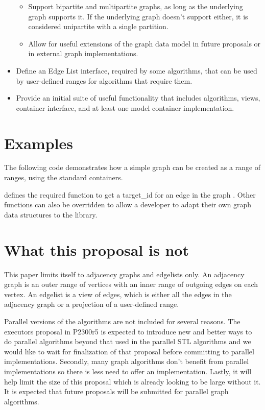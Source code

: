 \begin{itemize}
\begin{itemize}
\item Support bipartite and multipartite graphs, as long as the underlying graph supports it. If the underlying graph doesn't support either,
      it is considered unipartite with a single partition.
\item Allow for useful extensions of the graph data model in future proposals or in external graph implementations. 
\end{itemize}
\item Define an Edge List interface, required by some algorithms, that can be used by user-defined ranges for algorithms that require them.
\item Provide an initial suite of useful functionality that includes algorithms, views, container interface, and at least one 
model container implementation.
\end{itemize}

\section{Examples}


The following code demonstrates how a simple graph can be created as a range of ranges, using the standard containers. 



{\small
  
}

 defines the required function to get a target\_id for an edge in the graph . Other functions can also
be overridden to allow a developer to adapt their own graph data structures to the library.

\section{What this proposal is  \textbf{not}}

This paper limits itself to adjacency graphs and edgelists only. An adjacency graph is an outer range of vertices with an inner range of outgoing
edges on each vertex. An edgelist is a view of edges, which is either all the edges in the adjacency graph or a projection of a user-defined range.

Parallel versions of the algorithms are not included for several reasons. The executors proposal in P2300r5 \cite{REF_P2300r5} is expected to introduce new 
and better ways to do parallel algorithms beyond that used in the parallel STL algorithms and we would like to wait for finalization of that proposal before 
committing to parallel implementations. Secondly, many graph algorithms don't benefit from parallel implementations so there is less need to offer an implementation. 
Lastly, it will help limit the size of this proposal which is already looking to be large without it. It is expected that future proposals will be submitted for parallel graph algorithms. 

